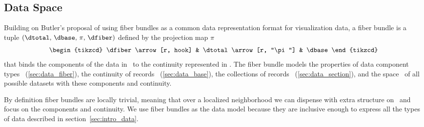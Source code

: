 \documentclass[../main.tex]{subfiles}
\begin{document}
\subsection{Data Space \dtotal}
\label{sec:data}
Building on Butler's proposal of using fiber bundles as a common data representation format for visualization data\cite{butlerVectorBundleClassesForm1992, butlerVisualizationModelBased1989}, a fiber bundle is a tuple $(\dtotal,\,\dbase,\,\pi ,\,\dfiber)$ defined by the projection map $\pi$
\begin{equation}
    \label{eq:fiber_bundle}
    \begin{tikzcd}
        \dfiber \arrow[r, hook] & \dtotal \arrow[r, "\pi"] & \dbase
    \end{tikzcd}
\end{equation}
that binds the components of the data in \dfiber\ to the continuity represented in \dbase. The fiber bundle models the properties of data component types \dfiber\ (\ref{sec:data_fiber}), the continuity of records \dbase\ (\ref{sec:data_base}), the collections of records \dsection\ (\ref{sec:data_section}), and the space \dtotal\ of all possible datasets with these components and continuity. 

By definition fiber bundles are locally trivial\cite{spanier1989algebraic,LocallyTrivialFibre}, meaning that over a localized neighborhood we can dispense with extra structure on \dtotal\ and focus on the components and continuity. We use fiber bundles as the data model because they are inclusive enough to express all the types of data described in section~\ref{sec:intro_data}. 
\end{document}
